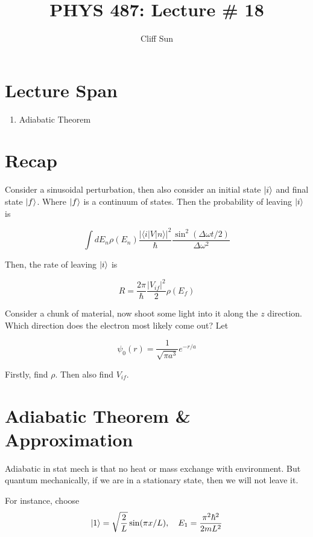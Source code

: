 \documentclass{article}
\title{PHYS 487: Lecture \# 18}
\author{Cliff Sun}
\newtheorem{one minute paper}[theorem]{One Minute Paper}
\begin{document}
\maketitle

\section*{Lecture Span}
\begin{enumerate}
    \item Adiabatic Theorem
\end{enumerate}

\section*{Recap}

Consider a sinusoidal perturbation, then also consider an initial state $\ket{i}$ and final state $\ket{f}$. Where $\ket{f}$ is a continuum of states. Then the probability of leaving $\ket{i}$ is 

\begin{equation}
    \int dE_n \rho(E_n)\frac{|\langle i | V | n \rangle |^2}{\hbar}\frac{\sin^2(\Delta \omega t/2)}{\Delta \omega^2}
\end{equation}

Then, the rate of leaving $\ket{i}$ is 

\begin{equation}
    R = \frac{2\pi}{\hbar}\frac{|V_{if}|^2}{2}\rho(E_f)
\end{equation}

Consider a chunk of material, now shoot some light into it along the $z$ direction. Which direction does the electron most likely come out? Let 

$$\psi_0(r) = \frac{1}{\sqrt{\pi a^3}}e^{-r/a}$$

Firstly, find $\rho$. Then also find $V_{if}$. 

\section*{Adiabatic Theorem \& Approximation}

Adiabatic in stat mech is that no heat or mass exchange with environment. But quantum mechanically, if we are in a stationary state, then we will not leave it. 

For instance, choose $$\ket{1} = \sqrt{\frac{2}{L}}\sin(\pi x/L), \quad E_1 = \frac{\pi^2 \hbar^2 }{2m L^2}$$
\end{document}
